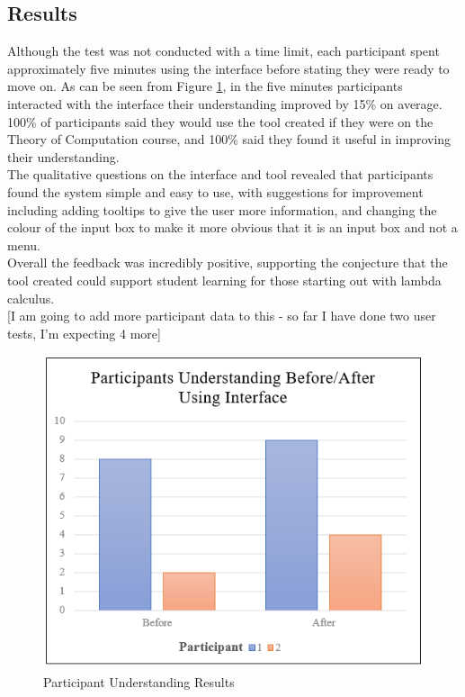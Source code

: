 \documentclass[a4paper,12pt]{report}
\begin{document}
\subsection{Results}
Although the test was not conducted with a time limit, each participant spent approximately five minutes using the interface before stating they were ready to move on. As can be seen from Figure \ref{participant_understanding}, in the five minutes participants interacted with the interface their understanding improved by 15\% on average. 100\% of participants said they would use the tool created if they were on the Theory of Computation course, and 100\% said they found it useful in improving their understanding.\\

The qualitative questions on the interface and tool revealed that participants found the system simple and easy to use, with suggestions for improvement including adding tooltips to give the user more information, and changing the colour of the input box to make it more obvious that it is an input box and not a menu.\\

Overall the feedback was incredibly positive, supporting the conjecture that the tool created could support student learning for those starting out with lambda calculus.\\

[I am going to add more participant data to this - so far I have done two user tests, I'm expecting 4 more]


\begin{figure}[h]
	\includegraphics{images/participant_understanding}
	\centering
	\caption{Participant Understanding Results}
	\label{participant_understanding}
\end{figure}
\end{document}
